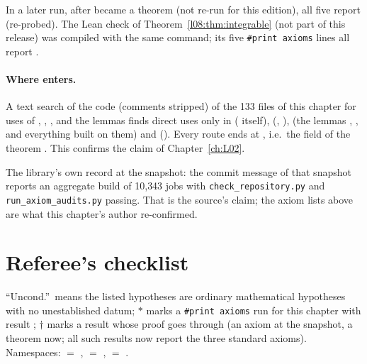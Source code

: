 In a later run, after  became a theorem (not re-run for this edition), all five report
 (re-probed).
The Lean check of Theorem~\ref{l08:thm:integrable} (not part of this release) was compiled with the same
command; its five \texttt{\#print axioms} lines all report \lean{[propext, Classical.}\allowbreak{}\allowbreak\lean{sound]}.

\paragraph{Where  enters.} A text search of the code (comments stripped) of the 133 files of
this chapter for uses of , , ,
\allowbreak{}\allowbreak{}\allowbreak{} and the  lemmas finds direct uses only in
 ( itself), 
(, \allowbreak{}\allowbreak{}\allowbreak{}),  (the lemmas
, ,  and everything built on them) and
 (). Every route ends at
\allowbreak{}\allowbreak{}\allowbreak{}, i.e.\ the field  of the theorem . This confirms the claim of
Chapter~\ref{ch:L02}.

The library's own record at the snapshot: the commit message of that snapshot reports an aggregate build of 10{,}343 jobs
with \texttt{check\_repository.py} and \texttt{run\_axiom\_audits.py} passing. That is the source's claim; the
axiom lists above are what this chapter's author re-confirmed.
\section{Referee's checklist}\label{l08:sec:checklist}

``Uncond.''\ means the listed hypotheses are ordinary mathematical hypotheses with no unestablished
datum; $\ast$ marks a \texttt{\#print axioms} run for this chapter with result
\lean{[propext, Classical.}\allowbreak{}\allowbreak\lean{sound]}; $\dagger$ marks a result whose proof goes through  (an axiom at the snapshot, a theorem
now; all such results now report the three standard axioms).
Namespaces:  $=$ ,  $=$ \allowbreak{}\allowbreak{},
 $=$ .

